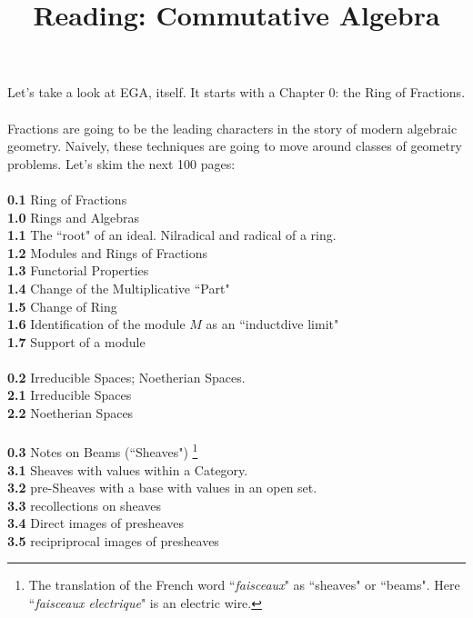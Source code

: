 \documentclass[12pt]{article}
\title{Reading: Commutative Algebra}
\date{}
\begin{document}
\sffamily

\maketitle

\noindent Let's take a look at EGA, itself.  It starts with a Chapter 0: the Ring of Fractions. \\ \\ 
Fractions are going to be the leading characters in the story of modern algebraic geometry.  Naively, these techniques are going to move around classes of geometry problems. Let's skim the next 100 pages: \\ \\
\textbf{0.1} Ring of Fractions \\ 
\indent \textbf{1.0} Rings and Algebras \\
\indent \textbf{1.1} The ``root" of an ideal.  Nilradical and radical of a ring. \\
\indent \textbf{1.2} Modules and Rings of Fractions \\ 
\indent \textbf{1.3} Functorial Properties \\
\indent \textbf{1.4} Change of the Multiplicative ``Part" \\
\indent \textbf{1.5} Change of Ring \\
\indent \textbf{1.6} Identification of the module $M$ as an ``inductdive limit" \\
\indent \textbf{1.7} Support of a module \\ \\
\textbf{0.2} Irreducible Spaces; Noetherian Spaces. \\
\indent \textbf{2.1} Irreducible Spaces \\
\indent \textbf{2.2} Noetherian Spaces \\ \\
\textbf{0.3} Notes on Beams (``Sheaves") \footnote{The translation of the French word ``\textit{faisceaux}" as ``sheaves" or ``beams".  Here ``\textit{faisceaux electrique}" is an electric wire.} \\ 
\indent \textbf{3.1} Sheaves with values within a Category. \\ 
\indent \textbf{3.2} pre-Sheaves with a base with values in an open set. \\ 
\indent \textbf{3.3} recollections on sheaves \\ 
\indent \textbf{3.4} Direct images of presheaves \\ 
\indent \textbf{3.5} recipriprocal images of presheaves \\
\end{document}

